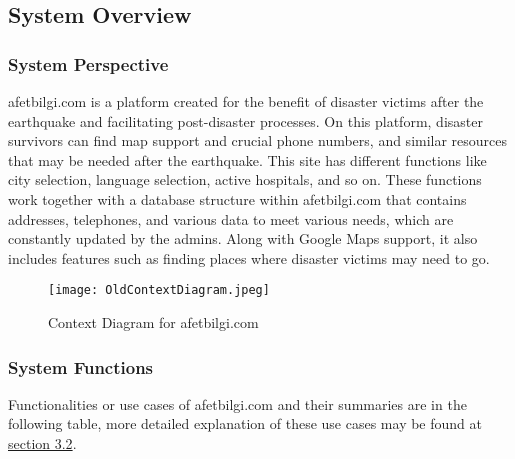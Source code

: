 \documentclass[11pt,a4paper]{article}
\begin{document}
\subsection{System Overview}

\subsubsection{System Perspective} 
afetbilgi.com is a platform created for the benefit of disaster victims after the earthquake and facilitating post-disaster processes. On this platform, disaster survivors can find map support and crucial phone numbers, and similar resources that may be needed after the earthquake. This site has different functions like city selection, language selection, active hospitals, and so on. These functions work together with a database structure within afetbilgi.com that contains addresses, telephones, and various data to meet various needs, which are constantly updated by the admins. Along with Google Maps support, it also includes features such as finding places where disaster victims may need to go.

\begin{figure}[H]
    \centering
    \texttt{[image: OldContextDiagram.jpeg]}
    \caption{Context Diagram for afetbilgi.com}
    \label{Context Diagram for afetbilgi.com}
\end{figure}

\subsubsection{System Functions}
Functionalities or use cases of afetbilgi.com and their summaries are in the following table, more detailed explanation of these use cases may be found at \hyperref[sec:Func]{section 3.2}.

\newpage
\end{document}
